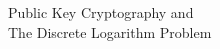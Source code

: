 \documentclass[preview]{standalone}
\begin{document}
\begin{center}
Public Key Cryptography and \\ The Discrete Logarithm Problem
\end{center}
\end{document}
